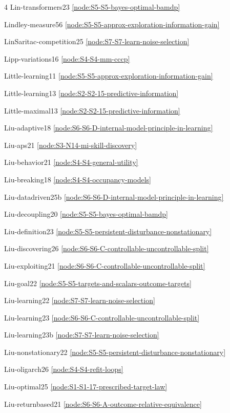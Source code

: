 \documentclass[10pt]{article}
\begin{document}
{\begin{multicols}{4}
Lin-transformers23 \hfill \ref{node:S5-S5-bayes-optimal-bamdp}\par
Lindley-measure56 \hfill \ref{node:S5-S5-approx-exploration-information-gain}\par
LinSaritac-competition25 \hfill \ref{node:S7-S7-learn-noise-selection}\par
Lipp-variations16 \hfill \ref{node:S4-S4-mm-cccp}\par
Little-learning11 \hfill \ref{node:S5-S5-approx-exploration-information-gain}\par
Little-learning13 \hfill \ref{node:S2-S2-15-predictive-information}\par
Little-maximal13 \hfill \ref{node:S2-S2-15-predictive-information}\par
Liu-adaptive18 \hfill \ref{node:S6-S6-D-internal-model-principle-in-learning}\par
Liu-aps21 \hfill \ref{node:S3-N14-mi-skill-discovery}\par
Liu-behavior21 \hfill \ref{node:S4-S4-general-utility}\par
Liu-breaking18 \hfill \ref{node:S4-S4-occupancy-models}\par
Liu-datadriven25b \hfill \ref{node:S6-S6-D-internal-model-principle-in-learning}\par
Liu-decoupling20 \hfill \ref{node:S5-S5-bayes-optimal-bamdp}\par
Liu-definition23 \hfill \ref{node:S5-S5-persistent-disturbance-nonstationary}\par
Liu-discovering26 \hfill \ref{node:S6-S6-C-controllable-uncontrollable-split}\par
Liu-exploiting21 \hfill \ref{node:S6-S6-C-controllable-uncontrollable-split}\par
Liu-goal22 \hfill \ref{node:S5-S5-targets-and-scalars-outcome-targets}\par
Liu-learning22 \hfill \ref{node:S7-S7-learn-noise-selection}\par
Liu-learning23 \hfill \ref{node:S6-S6-C-controllable-uncontrollable-split}\par
Liu-learning23b \hfill \ref{node:S7-S7-learn-noise-selection}\par
Liu-nonstationary22 \hfill \ref{node:S5-S5-persistent-disturbance-nonstationary}\par
Liu-oligarch26 \hfill \ref{node:S4-S4-refit-loops}\par
Liu-optimal25 \hfill \ref{node:S1-S1-17-prescribed-target-law}\par
Liu-returnbased21 \hfill \ref{node:S6-S6-A-outcome-relative-equivalence}\par

\end{multicols}}
\end{document}
